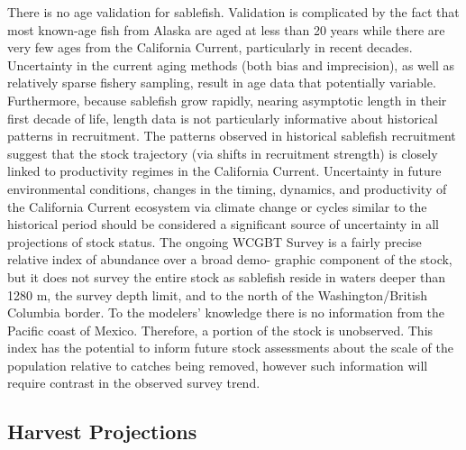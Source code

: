 \documentclass[11pt,
  english,
  a4paper,
]{article}
\begin{document}
There is no age validation for sablefish. Validation is complicated by the fact that most known-age fish from Alaska are aged at less than 20 years while there are very few ages from the California Current, particularly in recent decades. Uncertainty in the current aging methods (both bias and imprecision), as well as relatively sparse fishery sampling, result in age data that potentially variable. Furthermore, because sablefish grow rapidly, nearing asymptotic length in their first decade of life, length data is not particularly informative about historical patterns in recruitment. The patterns observed in historical sablefish recruitment suggest that the stock trajectory (via shifts in recruitment strength) is closely linked to productivity regimes in the California Current. Uncertainty in future environmental conditions, changes in the timing, dynamics, and productivity of the California Current ecosystem via climate change or cycles similar to the historical period should be considered a significant source of uncertainty in all projections of stock status. The ongoing WCGBT Survey is a fairly precise relative index of abundance over a broad demo- graphic component of the stock, but it does not survey the entire stock as sablefish reside in waters deeper than 1280 m, the survey depth limit, and to the north of the Washington/British Columbia border. To the modelers' knowledge there is no information from the Pacific coast of Mexico. Therefore, a portion of the stock is unobserved. This index has the potential to inform future stock assessments about the scale of the population relative to catches being removed, however such information will require contrast in the observed survey trend.

\leavevmode\tagmcend\tagstructend\par


\hypertarget{harvest-projections}{%
\subsection*{Harvest Projections}\label{harvest-projections}}

\leavevmode\tagmcend\tagstructend
\end{document}
